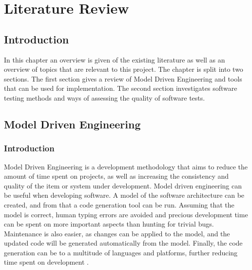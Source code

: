 \chapter{Literature Review}

\section{Introduction}
In this chapter an overview is given of the existing literature as well as an overview of topics that are relevant to this project. The chapter is split into two sections. The first section gives a review of Model Driven Engineering and tools that can be used for implementation. The second section investigates software testing methods and ways of assessing the quality of software tests.

\section{Model Driven Engineering}

\subsection{Introduction}
Model Driven Engineering is a development methodology that aims to reduce the amount of time spent on projects, as well as increasing the consistency and quality of the item or system under development. Model driven engineering can be useful when developing software. A model of the software architecture can be created, and from that a code generation tool can be run. Assuming that the model is correct, human typing errors are avoided and precious development time can be spent on more important aspects than hunting for trivial bugs. Maintenance is also easier, as changes can be applied to the model, and the updated code will be generated automatically from the model. Finally, the code generation can be to a multitude of languages and platforms, further reducing time spent on development \cite{mdseLano}.


